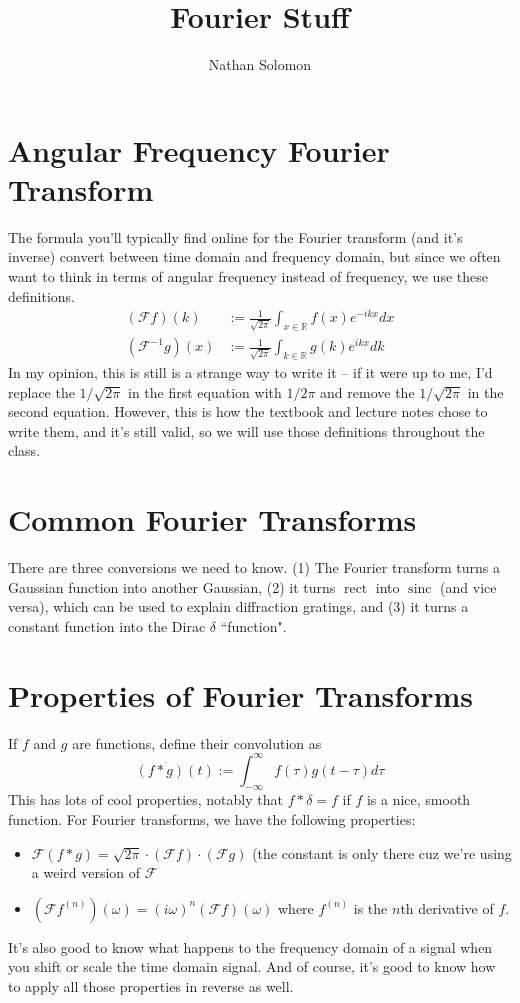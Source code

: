 \documentclass[12pt]{article}
\begin{document}
\title{Fourier Stuff}
\author{Nathan Solomon}
\maketitle

\section{Angular Frequency Fourier Transform}
The formula you'll typically find online for the Fourier transform (and it's inverse) convert between time domain and frequency domain, but since we often want to think in terms of angular frequency instead of frequency, we use these definitions.
\begin{align*}
    (\mathcal{F} f)(k) &:= \frac{1}{\sqrt{2 \pi}} \int_{x \in \mathbb{R}} f(x) e^{-ikx} dx \\
    (\mathcal{F}^{-1} g)(x) &:= \frac{1}{\sqrt{2 \pi}} \int_{k \in \mathbb{R}} g(k) e^{ikx} dk
\end{align*}
In my opinion, this is still is a strange way to write it -- if it were up to me, I'd replace the $1/\sqrt{2 \pi}$ in the first equation with $1/2 \pi$ and remove the $1/\sqrt{2 \pi}$ in the second equation. However, this is how the textbook and lecture notes chose to write them, and it's still valid, so we will use those definitions throughout the class.

\section{Common Fourier Transforms}
There are three conversions we need to know. (1) The Fourier transform turns a Gaussian function into another Gaussian, (2) it turns $\operatorname{rect}$ into $\operatorname{sinc}$ (and vice versa), which can be used to explain diffraction gratings, and (3) it turns a constant function into the Dirac $\delta$ ``function".

\section{Properties of Fourier Transforms}
If $f$ and $g$ are functions, define their convolution as
\[ (f * g)(t) := \int_{-\infty}^\infty f(\tau)g(t-\tau)d\tau \]
This has lots of cool properties, notably that $f * \delta = f$ if $f$ is a nice, smooth function. For Fourier transforms, we have the following properties:
\begin{itemize}
    \item $\mathcal{F}(f * g) = \sqrt{2 \pi} \cdot (\mathcal{F} f) \cdot (\mathcal{F} g)$ (the constant is only there cuz we're using a weird version of $\mathcal{F}$
    \item $(\mathcal{F} f^{(n)}) (\omega) = (i \omega)^n (\mathcal{F} f)(\omega)$ where $f^{(n)}$ is the $n$th derivative of $f$.
\end{itemize}
It's also good to know what happens to the frequency domain of a signal when you shift or scale the time domain signal. And of course, it's good to know how to apply all those properties in reverse as well.
\end{document}
